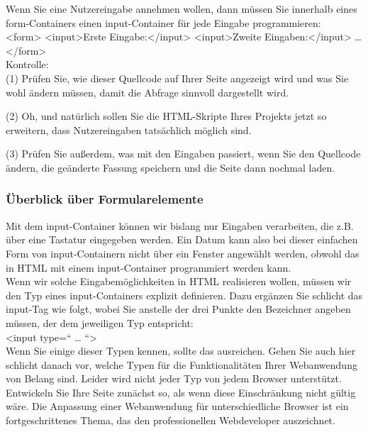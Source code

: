 Wenn Sie eine Nutzereingabe annehmen wollen, dann müssen Sie innerhalb eines form-Containers einen input-Container für jede Eingabe programmieren:\\

<form>
<input>Erste Eingabe:</input>
<input>Zweite Eingaben:</input>
… 
</form>\\

Kontrolle:\\

(1)	Prüfen Sie, wie dieser Quellcode auf Ihrer Seite angezeigt wird und was Sie wohl ändern müssen, damit die Abfrage sinnvoll dargestellt wird.

(2)	Oh, und natürlich sollen Sie die HTML-Skripte Ihres Projekts jetzt so erweitern, dass Nutzereingaben tatsächlich möglich sind.

(3)	Prüfen Sie außerdem, was mit den Eingaben passiert, wenn Sie den Quellcode ändern, die geänderte Fassung speichern und die Seite dann nochmal laden.

\subsubsection{Überblick über Formularelemente}

Mit dem input-Container können wir bislang nur Eingaben verarbeiten, die z.B. über eine Tastatur eingegeben werden. Ein Datum kann also bei dieser einfachen Form von input-Containern nicht über ein Fenster angewählt werden, obwohl das in HTML mit einem input-Container programmiert werden kann. \\

Wenn wir solche Eingabemöglichkeiten in HTML realisieren wollen, müssen wir den Typ eines input-Containers explizit definieren. Dazu ergänzen Sie schlicht das input-Tag wie folgt, wobei Sie anstelle der drei Punkte den Bezeichner angeben müssen, der dem jeweiligen Typ entspricht:\\

<input type=“ … “>\\

Wenn Sie einige dieser Typen kennen, sollte das ausreichen. Gehen Sie auch hier schlicht danach vor, welche Typen für die Funktionalitäten Ihrer Webanwendung von Belang sind. Leider wird nicht jeder Typ von jedem Browser unterstützt. Entwickeln Sie Ihre Seite zunächst so, als wenn diese Einschränkung nicht gültig wäre. Die Anpassung einer Webanwendung für unterschiedliche Browser ist ein fortgeschrittenes Thema, das den professionellen Webdeveloper auszeichnet.\\

